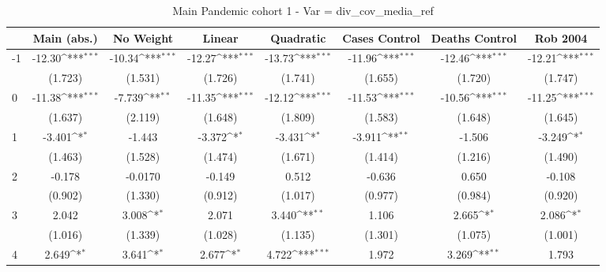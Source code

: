\documentclass{article}
\begin{document}
{
\def\sym#1{\ifmmode^{#1}\else\(^{#1}\)\fi}
\begin{longtable}{l*{7}{c}}
\caption{Main Pandemic cohort 1 - Var = div\_cov\_media\_ref}\\
\hline\hline\endfirsthead\hline\endhead\hline\endfoot\endlastfoot
                &\multicolumn{1}{c}{Main (abs.)}&\multicolumn{1}{c}{No Weight}&\multicolumn{1}{c}{Linear}&\multicolumn{1}{c}{Quadratic}&\multicolumn{1}{c}{Cases Control}&\multicolumn{1}{c}{Deaths Control}&\multicolumn{1}{c}{Rob 2004}\\
\hline
-1              &   -12.30\sym{***}&   -10.34\sym{***}&   -12.27\sym{***}&   -13.73\sym{***}&   -11.96\sym{***}&   -12.46\sym{***}&   -12.21\sym{***}\\
                &  (1.723)         &  (1.531)         &  (1.726)         &  (1.741)         &  (1.655)         &  (1.720)         &  (1.747)         \\
0               &   -11.38\sym{***}&   -7.739\sym{**} &   -11.35\sym{***}&   -12.12\sym{***}&   -11.53\sym{***}&   -10.56\sym{***}&   -11.25\sym{***}\\
                &  (1.637)         &  (2.119)         &  (1.648)         &  (1.809)         &  (1.583)         &  (1.648)         &  (1.645)         \\
1               &   -3.401\sym{*}  &   -1.443         &   -3.372\sym{*}  &   -3.431\sym{*}  &   -3.911\sym{**} &   -1.506         &   -3.249\sym{*}  \\
                &  (1.463)         &  (1.528)         &  (1.474)         &  (1.671)         &  (1.414)         &  (1.216)         &  (1.490)         \\
2               &   -0.178         &  -0.0170         &   -0.149         &    0.512         &   -0.636         &    0.650         &   -0.108         \\
                &  (0.902)         &  (1.330)         &  (0.912)         &  (1.017)         &  (0.977)         &  (0.984)         &  (0.920)         \\
3               &    2.042         &    3.008\sym{*}  &    2.071         &    3.440\sym{**} &    1.106         &    2.665\sym{*}  &    2.086\sym{*}  \\
                &  (1.016)         &  (1.339)         &  (1.028)         &  (1.135)         &  (1.301)         &  (1.075)         &  (1.001)         \\
4               &    2.649\sym{*}  &    3.641\sym{*}  &    2.677\sym{*}  &    4.722\sym{***}&    1.972         &    3.269\sym{**} &    1.793         \\

\end{longtable}}
\end{document}
